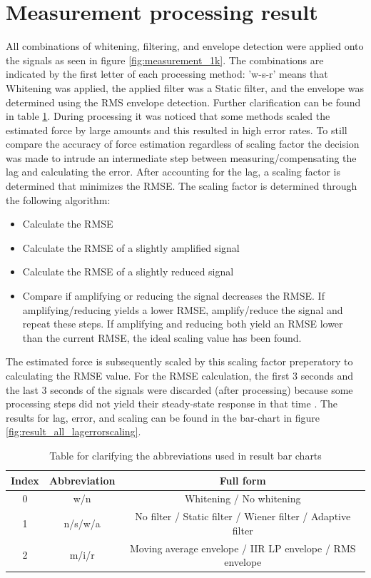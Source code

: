 \section{Measurement processing result}
All combinations of whitening, filtering, and envelope detection were applied onto the signals as seen in figure \ref{fig:measurement_1k}. The combinations are indicated by the first letter of each processing method: 'w-s-r' means that Whitening was applied, the applied filter was a Static filter, and the envelope was determined using the RMS envelope detection. Further clarification can be found in table \ref{tab:abbreviation_explanation}.
During processing it was noticed that some methods scaled the estimated force by large amounts and this resulted in high error rates. To still compare the accuracy of force estimation regardless of scaling factor the decision was made to intrude an intermediate step between measuring/compensating the lag and calculating the error. After accounting for the lag, a scaling factor is determined that minimizes the RMSE. The scaling factor is determined through the following algorithm:
\begin{itemize}
    \item Calculate the RMSE
    \item Calculate the RMSE of a slightly amplified signal
    \item Calculate the RMSE of a slightly reduced signal
    \item Compare if amplifying or reducing the signal decreases the RMSE. If amplifying/reducing yields a lower RMSE, amplify/reduce the signal and repeat these steps. If amplifying and reducing both yield an RMSE lower than the current RMSE, the ideal scaling value has been found.
\end{itemize}

The estimated force is subsequently scaled by this scaling factor preperatory to calculating the RMSE value. For the RMSE calculation, the first 3 seconds and the last 3 seconds of the signals were discarded (after processing) because some processing steps did not yield their steady-state response in that time \cite{transient_response}. The results for lag, error, and scaling can be found in the bar-chart in figure \ref{fig:result_all_lagerrorscaling}. 

\begin{table} [h!]
\begin{tabular}{ccc}
Index & Abbreviation & Full form \\
\hline
0 & w/n & Whitening / No whitening \\
1 & n/s/w/a & No filter / Static filter / Wiener filter / Adaptive filter \\
2 & m/i/r & Moving average envelope / IIR LP envelope / RMS envelope \\
\end{tabular}
\caption{Table for clarifying the abbreviations used in result bar charts}
\label{tab:abbreviation_explanation}
\end{table}

